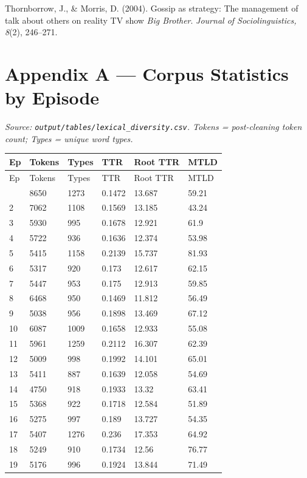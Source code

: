 \documentclass[11pt]{article}
\begin{document}
Thornborrow, J., \& Morris, D. (2004). Gossip as strategy: The management of talk about others on reality TV show \emph{Big Brother}. \emph{Journal of Sociolinguistics, 8}(2), 246--271.


\section*{Appendix A --- Corpus Statistics by Episode}

\emph{Source: \texttt{output/tables/lexical\_diversity.csv}. Tokens = post-cleaning token count; Types = unique word types.}

\small\setlength{\tabcolsep}{4pt}

\begin{longtable}{llllll}
\toprule
Ep & Tokens & Types & TTR & Root TTR & MTLD \\
\midrule
\endfirsthead
\toprule
Ep & Tokens & Types & TTR & Root TTR & MTLD \\
\midrule
\endhead
\bottomrule
\endlastfoot
1 & 8650 & 1273 & 0.1472 & 13.687 & 59.21 \\
2 & 7062 & 1108 & 0.1569 & 13.185 & 43.24 \\
3 & 5930 & 995 & 0.1678 & 12.921 & 61.9 \\
4 & 5722 & 936 & 0.1636 & 12.374 & 53.98 \\
5 & 5415 & 1158 & 0.2139 & 15.737 & 81.93 \\
6 & 5317 & 920 & 0.173 & 12.617 & 62.15 \\
7 & 5447 & 953 & 0.175 & 12.913 & 59.85 \\
8 & 6468 & 950 & 0.1469 & 11.812 & 56.49 \\
9 & 5038 & 956 & 0.1898 & 13.469 & 67.12 \\
10 & 6087 & 1009 & 0.1658 & 12.933 & 55.08 \\
11 & 5961 & 1259 & 0.2112 & 16.307 & 62.39 \\
12 & 5009 & 998 & 0.1992 & 14.101 & 65.01 \\
13 & 5411 & 887 & 0.1639 & 12.058 & 54.69 \\
14 & 4750 & 918 & 0.1933 & 13.32 & 63.41 \\
15 & 5368 & 922 & 0.1718 & 12.584 & 51.89 \\
16 & 5275 & 997 & 0.189 & 13.727 & 54.35 \\
17 & 5407 & 1276 & 0.236 & 17.353 & 64.92 \\
18 & 5249 & 910 & 0.1734 & 12.56 & 76.77 \\
19 & 5176 & 996 & 0.1924 & 13.844 & 71.49 \\

\end{longtable}
\end{document}
